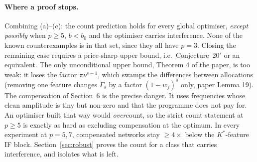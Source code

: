 \documentclass[11pt]{article}
\theoremstyle{definition}
\begin{document}
\paragraph{Where a proof stops.}  Combining (a)--(c): the count prediction holds for every global optimiser, \emph{except
possibly} when $p\ge5$, $b<b_0$ and the optimiser carries interference.  None of the known counterexamples is in that set,
since they all have $p=3$.  Closing the remaining case requires a price-sharp upper bound, i.e.\ Conjecture~20$'$ or an
equivalent.  The only unconditional upper bound, Theorem 4 of the paper, is too weak: it loses the factor
$\pi\nu^{s-1}$, which swamps the differences between allocations (removing one feature changes $\Gamma_s$ by a
factor $(1-w_j)^s$ only, paper Lemma 19).  The compensation of Section~6 is the precise danger.  It uses frequencies whose
clean amplitude is tiny but non-zero and that the programme does not pay for.  An optimiser built that way would
\emph{over}count, so the strict count statement at $p\ge5$ is exactly as hard as excluding compensation at the optimum.
In every experiment at $p=5,7$, compensated networks stay $\ge4\times$ below the $K^*$-feature IF block.  Section~\ref{sec:robust} proves the count for a class that carries interference, and isolates what is left.
\end{document}
